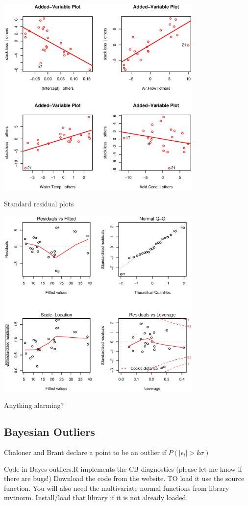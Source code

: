 \documentclass[11]{article}
\begin{document}
\centerline{\includegraphics[width=4in]{stackloss-avp.ps}} 

Standard residual plots 

\centerline{\includegraphics[width=4in]{stackloss-residuals.ps}}

Anything alarming? 


\subsection*{Bayesian Outliers}
Chaloner and Brant declare a point to be an outlier if $P(|\epsilon_i|
> k \sigma)$

Code in Bayes-outliers.R implements the CB diagnostics (please let me know if there are bugs!)  Download the code from the website.  TO load it use the source function.  You will also need the multivariate normal functions from library mvtnorm. Install/load that library if it is not already loaded.
\end{document}
